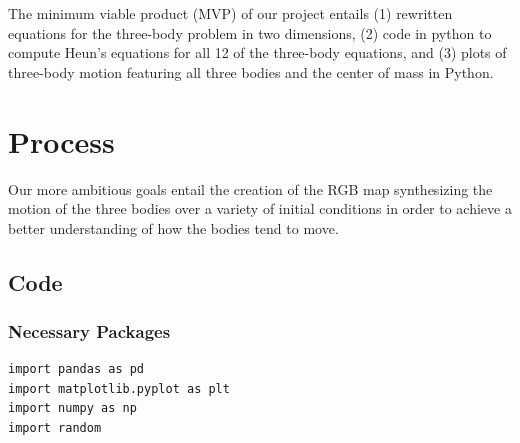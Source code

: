 \documentclass{article}
\begin{document}
The minimum viable product (MVP) of our project entails (1) rewritten equations for the three-body problem in two dimensions, (2) code in python to compute Heun's equations for all 12 of the three-body equations, and (3) plots of three-body motion featuring all three bodies and the center of mass in Python. 

\section{Process}
Our more ambitious goals entail the creation of the RGB map synthesizing the motion of the three bodies over a variety of initial conditions in order to achieve a better understanding of how the bodies tend to move. 
\subsection{Code}
\subsubsection{Necessary Packages}
\begin{verbatim}
import pandas as pd
import matplotlib.pyplot as plt
import numpy as np
import random
\end{verbatim}
\end{document}
